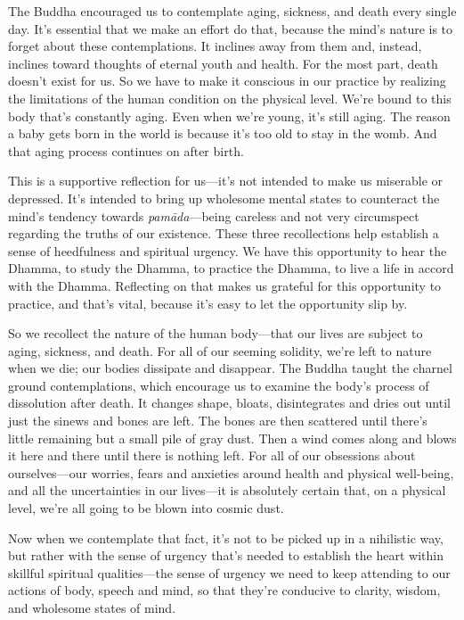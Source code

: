 
The Buddha encouraged us to contemplate aging, sickness, and death 
every single day. It's essential that we make an effort do that, 
because the mind's nature is to forget about these contemplations. It 
inclines away from them and, instead, inclines toward thoughts of 
eternal youth and health. For the most part, death doesn't exist for 
us. So we have to make it conscious in our practice by realizing the 
limitations of the human condition on the physical level. We're bound 
to this body that's constantly aging. Even when we're young, it's still 
aging. The reason a baby gets born in the world is because it's too old 
to stay in the womb. And that aging process continues on after birth.

This is a supportive reflection for us---it's not intended to make us 
miserable or depressed. It's intended to bring up wholesome mental 
states to counteract the mind's tendency towards \emph{pamāda}---being 
careless and not very circumspect regarding the truths of our 
existence. These three recollections help establish a sense of 
heedfulness and spiritual urgency. We have this opportunity to hear the 
Dhamma, to study the Dhamma, to practice the Dhamma, to live a life in 
accord with the Dhamma. Reflecting on that makes us grateful for this 
opportunity to practice, and that's vital, because it's easy to let the 
opportunity slip by.

So we recollect the nature of the human body---that our lives are 
subject to aging, sickness, and death. For all of our seeming solidity, 
we're left to nature when we die; our bodies dissipate and disappear. 
The Buddha taught the charnel ground contemplations, which encourage us 
to examine the body's process of dissolution after death. It changes 
shape, bloats, disintegrates and dries out until just the sinews and 
bones are left. The bones are then scattered until there's little 
remaining but a small pile of gray dust. Then a wind comes along and 
blows it here and there until there is nothing left. For all of our 
obsessions about ourselves---our worries, fears and anxieties around 
health and physical well-being, and all the uncertainties in our 
lives---it is absolutely certain that, on a physical level, we're all 
going to be blown into cosmic dust.

Now when we contemplate that fact, it's not to be picked up in a 
nihilistic way, but rather with the sense of urgency that's needed to 
establish the heart within skillful spiritual qualities---the sense of 
urgency we need to keep attending to our actions of body, speech and 
mind, so that they're conducive to clarity, wisdom, and wholesome 
states of mind.

